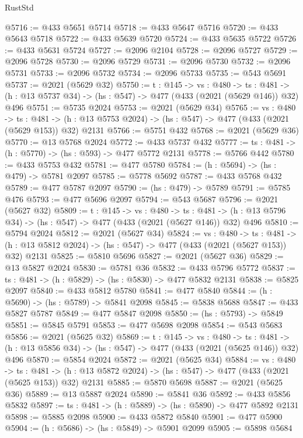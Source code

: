 \begin{lexlean}{RustStd}
\begin{coremodule}
{\begin{coremodule}
{{{{{{{{{{{{{{{{@5716 := @433 @5651 @5714
@5718 := @433 @5647 @5716
@5720 := @433 @5643 @5718
@5722 := @433 @5639 @5720
@5724 := @433 @5635 @5722
@5726 := @433 @5631 @5724
@5727 := @2096 @2104
@5728 := @2096 @5727
@5729 := @2096 @5728
@5730 := @2096 @5729
@5731 := @2096 @5730
@5732 := @2096 @5731
@5733 := @2096 @5732
@5734 := @2096 @5733
@5735 := @543 @5691
@5737 := @2021 (@5629 @32)
@5750 := {t : @145} ->
  {vs : @480} ->
  {ts : @481} -> (h : @13 @5737 @34) -> (hs : @547) -> @477 (@433 (@2021 (@5629 @146)) @32) @496
@5751 := @5735 @2024
@5753 := @2021 (@5629 @34)
@5765 := {vs : @480} ->
  {ts : @481} -> (h : @13 @5753 @2024) -> (hs : @547) -> @477 (@433 (@2021 (@5629 @153)) @32) @2131
@5766 := @5751 @432
@5768 := @2021 (@5629 @36)
@5770 := @13 @5768 @2024
@5772 := @433 @5737 @432
@5777 := {ts : @481} -> (h : @5770) -> (hs : @593) -> @477 @5772 @2131
@5778 := @5766 @442
@5780 := @433 @5753 @432
@5781 := @477 @5780
@5784 := (h : @5694) -> (hs : @479) -> @5781 @2097
@5785 := @5778 @5692
@5787 := @433 @5768 @432
@5789 := @477 @5787 @2097
@5790 := (hs : @479) -> @5789
@5791 := @5785 @476
@5793 := @477 @5696 @2097
@5794 := @543 @5687
@5796 := @2021 (@5627 @32)
@5809 := {t : @145} ->
  {vs : @480} ->
  {ts : @481} -> (h : @13 @5796 @34) -> (hs : @547) -> @477 (@433 (@2021 (@5627 @146)) @32) @496
@5810 := @5794 @2024
@5812 := @2021 (@5627 @34)
@5824 := {vs : @480} ->
  {ts : @481} -> (h : @13 @5812 @2024) -> (hs : @547) -> @477 (@433 (@2021 (@5627 @153)) @32) @2131
@5825 := @5810 @5696
@5827 := @2021 (@5627 @36)
@5829 := @13 @5827 @2024
@5830 := @5781 @36
@5832 := @433 @5796 @5772
@5837 := {ts : @481} -> (h : @5829) -> (hs : @5830) -> @477 @5832 @2131
@5838 := @5825 @2097
@5840 := @433 @5812 @5780
@5841 := @477 @5840
@5844 := (h : @5690) -> (hs : @5789) -> @5841 @2098
@5845 := @5838 @5688
@5847 := @433 @5827 @5787
@5849 := @477 @5847 @2098
@5850 := (hs : @5793) -> @5849
@5851 := @5845 @5791
@5853 := @477 @5698 @2098
@5854 := @543 @5683
@5856 := @2021 (@5625 @32)
@5869 := {t : @145} ->
  {vs : @480} ->
  {ts : @481} -> (h : @13 @5856 @34) -> (hs : @547) -> @477 (@433 (@2021 (@5625 @146)) @32) @496
@5870 := @5854 @2024
@5872 := @2021 (@5625 @34)
@5884 := {vs : @480} ->
  {ts : @481} -> (h : @13 @5872 @2024) -> (hs : @547) -> @477 (@433 (@2021 (@5625 @153)) @32) @2131
@5885 := @5870 @5698
@5887 := @2021 (@5625 @36)
@5889 := @13 @5887 @2024
@5890 := @5841 @36
@5892 := @433 @5856 @5832
@5897 := {ts : @481} -> (h : @5889) -> (hs : @5890) -> @477 @5892 @2131
@5898 := @5885 @2098
@5900 := @433 @5872 @5840
@5901 := @477 @5900
@5904 := (h : @5686) -> (hs : @5849) -> @5901 @2099
@5905 := @5898 @5684
}}}}}}}}}}}}}}}}
\end{coremodule}}
\end{coremodule}
\end{lexlean}

